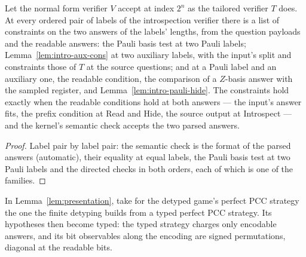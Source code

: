 \begin{lemma}
\label{lem:intro-typed-cons}
\leanok
Let the normal form verifier $V$ accept at index $2^n$ as the tailored verifier $T$ does. At every
ordered pair of labels of the introspection verifier there is a list of constraints on the two
answers of the labels' lengths, from the question payloads and the readable answers: the Pauli
basis test at two Pauli labels; Lemma~\ref{lem:intro-aux-cons} at two auxiliary labels, with the
input's split and constraints those of $T$ at the source questions; and at a Pauli label and an
auxiliary one, the readable condition, the comparison of a $Z$-basis answer with the sampled
register, and Lemma~\ref{lem:intro-pauli-hide}. The constraints hold exactly when the readable
conditions hold at both answers --- the input's answer fits, the prefix condition at Read and
Hide, the source output at Introspect --- and the kernel's semantic check accepts the two parsed
answers.
\end{lemma}

\begin{proof}
\leanok
Label pair by label pair: the semantic check is the format of the parsed answers (automatic),
their equality at equal labels, the Pauli basis test at two Pauli labels and the directed checks
in both orders, each of which is one of the families.
\end{proof}

\begin{lemma}
\label{lem:presentation-typed}
\leanok
In Lemma~\ref{lem:presentation}, take for the detyped game's perfect PCC strategy the one the
finite detyping builds from a typed perfect PCC strategy. Its hypotheses then become typed: the
typed strategy charges only encodable answers, and its bit observables along the encoding are
signed permutations, diagonal at the readable bits.
\end{lemma}

